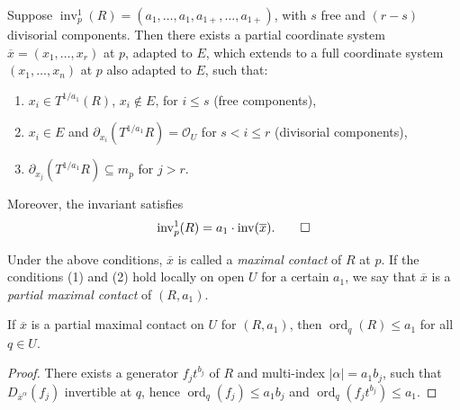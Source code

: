 \documentclass{amsart}
\newcommand{\ord}{{\operatorname{ord}}}
\newcommand{\inv}{{\operatorname{inv}}}
\begin{document}
\begin{lemma}
Suppose \( \inv_p^1(R) = (a_1, \ldots, a_1, a_{1+}, \ldots, a_{1+}) \), with \( s \) free and \( (r - s) \) divisorial components. Then there exists a partial coordinate system \( \overline{x} = (x_1, \ldots, x_r) \) at \( p \), adapted to \( E \), which extends to a full coordinate system \( (x_1, \ldots, x_n) \) at $p$ also adapted to \( E \), such that:
\begin{enumerate}
    \item \( x_i \in T^{1/a_1}(R) \), $x_i\notin E$, for \( i \leq s \) (free components),
    \item \( x_i \in E \) and \( \partial_{x_i}(T^{1/a_1} R) = \mathcal{O}_U \) for \( s < i \leq r \) (divisorial components),
    \item \( \partial_{x_j}(T^{1/a_1} R) \subseteq m_p \) for \( j > r \).
\end{enumerate}
Moreover, the invariant satisfies
\[
\inv_p^1(R) = a_1 \cdot \inv(\overline{x}). \qed
\]
\end{lemma}


\begin{definition} \label{maxim}
Under the above conditions, $\overline{x}$ is called a \emph{maximal contact} of $R$ at $p$. If the conditions (1) and (2)  hold locally on open $U$ for a certain $a_1$, we say that $\overline{x}$ is a \emph{partial maximal contact} of $(R,a_1)$.
\end{definition}
\begin{lemma} \label{obvious}
If $\overline{x}$ is a partial maximal contact on $U$ for $(R,a_1)$, then $\ord_q(R) \leq a_1$ for all $q \in U$.
\end{lemma}
\begin{proof}
There exists a generator $f_jt^{b_j}$ of $R$ and multi-index $|\alpha| = a_1 b_j$, such that $D_{\overline{x}^\alpha}(f_j)$ invertible at $q$, hence  $\ord_q(f_j) \leq a_1b_j$ and 
$\ord_q(f_jt^{b_j}) \leq  a_1$.
\end{proof}
\end{document}
